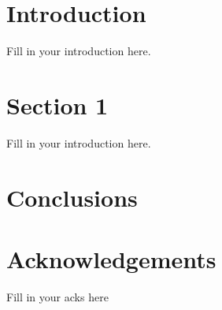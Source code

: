 \documentclass[11pt]{article}
\def\baselinestretch{1.15}
\begin{document}
\def\title{Information Retrieval from Structured and Semi-Structured Databases}
\def\what{B. Tech. Stage-I Project Report }
\def\degree{Bachelor~of~Technology}
\def\who{Shariq Rizvi}
\def\roll{99005003}
\def\guide{Dr. S. Sudarshan}

\titlpage
\def\bsq{\begin{flushright} $\blacksquare$\\ \end{flushright}}
\def\tab{\hspace{5mm}}

\begingroup{}\def\baselinestretch{1.5}\tableofcontents\endgroup     
\newpage
\begin{abstract}
Fill in your abstract here. 
\end{abstract}
% 
\newpage
{}

\section{Introduction}

Fill in your introduction here.

\section{Section 1}

Fill in your introduction here.

\section{Conclusions}

% 

\section*{Acknowledgements}

Fill in your acks here



\end{document}
